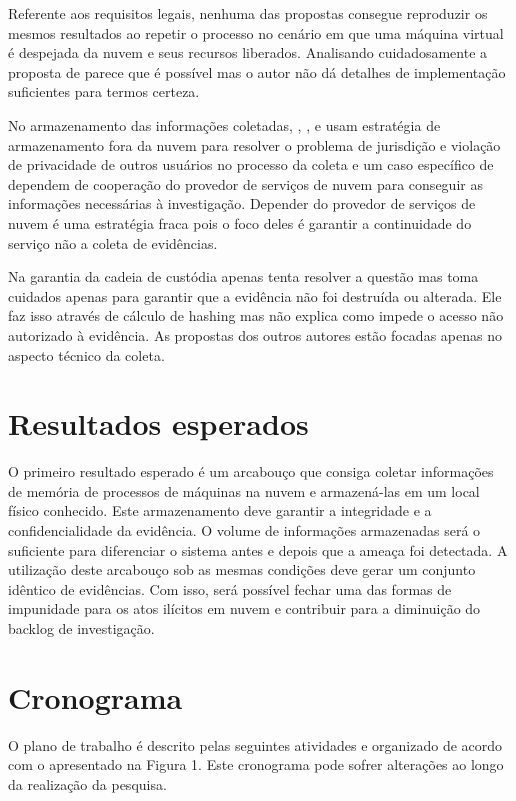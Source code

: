 \documentclass[12pt,				%
	openright,			%
	oneside,			%
	a4paper,			%
	english,			%
	brazil				%
	]{abntex2}
\begin{document}
Referente aos requisitos legais, nenhuma das propostas consegue reproduzir os mesmos resultados ao repetir o processo no cenário em que uma máquina virtual é despejada da nuvem e seus 
recursos liberados. Analisando cuidadosamente a proposta de \cite{George2012} parece que é possível mas o autor não dá detalhes de implementação suficientes para termos certeza.

No armazenamento das informações coletadas, \cite{Reichert2015}, \cite{George2012}, \cite{Poisel2013} e \cite{Dykstra2013} usam estratégia de armazenamento fora da nuvem para 
resolver o problema de jurisdição e violação de privacidade de outros usuários no processo da coleta \cite{Sang2013} e um caso específico de \cite{George2012} dependem de 
cooperação do provedor de serviços de nuvem para conseguir as informações necessárias à investigação. Depender do provedor de serviços de nuvem é uma estratégia fraca pois o foco
deles é garantir a continuidade do serviço não a coleta de evidências. 

Na garantia da cadeia de custódia apenas \cite{Sang2013} tenta resolver a questão mas toma cuidados apenas para  garantir que a evidência não foi destruída ou alterada. 
Ele faz isso através de cálculo de hashing mas não explica como impede o acesso não autorizado à evidência. As propostas dos outros autores estão focadas apenas no 
aspecto técnico da coleta.

\chapter{Resultados esperados} \label{chap:result}
O primeiro resultado esperado é um arcabouço que consiga coletar informações de memória de processos de máquinas na nuvem e armazená-las em um local físico conhecido.
Este armazenamento deve garantir a integridade e a confidencialidade da evidência. O volume de informações armazenadas será o suficiente para diferenciar o sistema antes 
e depois que a ameaça foi detectada. A utilização deste arcabouço sob as mesmas condições deve gerar um conjunto idêntico de evidências. Com isso, será possível fechar 
uma das formas de impunidade para os atos ilícitos em nuvem e contribuir para a diminuição do backlog de investigação.

\chapter{Cronograma} \label{chap:cronograma}

O plano de trabalho é descrito pelas seguintes atividades e organizado de acordo com o apresentado na Figura 1. Este cronograma pode sofrer alterações ao longo da realização da
pesquisa.
\end{document}
